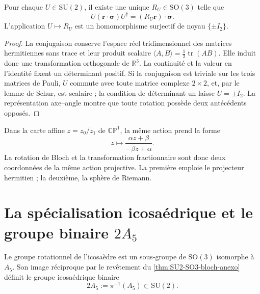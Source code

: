 \begin{theorem}
\label{thm:SU2-SO3-bloch-anexo}
Pour chaque \(U\in\mathrm{SU}(2)\), il existe une unique
\(R_U\in\mathrm{SO}(3)\) telle que
\begin{equation}
 U(\boldsymbol r\cdot\boldsymbol\sigma)U^\dagger
 =(R_U\boldsymbol r)\cdot\boldsymbol\sigma.
 \label{eq:accion-SU2-bloch-anexo}
\end{equation}
L'application \(U\mapsto R_U\) est un homomorphisme surjectif de noyau
\(\{\pm I_2\}\).
\end{theorem}

\begin{proof}
La conjugaison conserve l'espace réel tridimensionnel des matrices hermitiennes
sans trace et leur produit scalaire
\(\langle A,B\rangle=\tfrac12\operatorname{tr}(AB)\). Elle induit donc une
transformation orthogonale de \(\mathbb R^3\). La continuité et la valeur en
l'identité fixent un déterminant positif. Si la conjugaison est triviale sur les
trois matrices de Pauli, \(U\) commute avec toute matrice complexe \(2\times2\),
et, par le lemme de Schur, est scalaire ; la condition de déterminant un laisse
\(U=\pm I_2\). La représentation axe--angle montre que toute rotation possède
deux antécédents opposés.
\end{proof}

Dans la carte affine \(z=z_0/z_1\) de \(\mathbb{CP}^{1}\), la même action prend
la forme
\begin{equation}
 z\longmapsto
 \frac{\alpha z+\beta}
      {-\overline\beta z+\overline\alpha}.
 \label{eq:mobius-SU2-anexo}
\end{equation}
La rotation de Bloch et la transformation fractionnaire sont donc deux
coordonnées de la même action projective. La première emploie le projecteur
hermitien ; la deuxième, la sphère de Riemann.

\section{La spécialisation icosaédrique et le groupe binaire \texorpdfstring{\(2A_5\)}{2A5}}

Le groupe rotationnel de l'icosaèdre est un sous-groupe de
\(\mathrm{SO}(3)\) isomorphe à \(A_5\). Son image réciproque par le revêtement du
\cref{thm:SU2-SO3-bloch-anexo} définit le groupe icosaédrique binaire
\begin{equation}
 2A_5:=\pi^{-1}(A_5)\subset\mathrm{SU}(2).
 \label{eq:def-2A5-anexo}
\end{equation}

